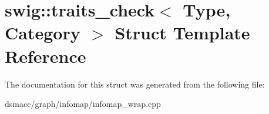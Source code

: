 \hypertarget{structswig_1_1traits__check}{}\section{swig\+:\+:traits\+\_\+check$<$ Type, Category $>$ Struct Template Reference}
\label{structswig_1_1traits__check}


The documentation for this struct was generated from the following file\+:\begin{DoxyCompactItemize}
\item 
dsmacc/graph/infomap/infomap\+\_\+wrap.\+cpp\end{DoxyCompactItemize}
